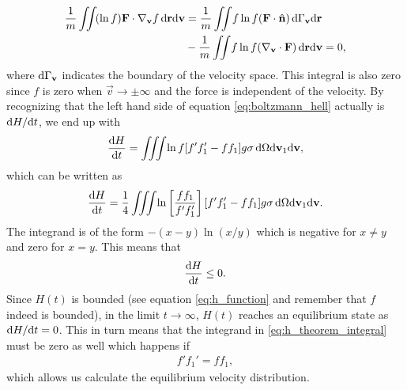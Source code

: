 \begin{align}
	\nonumber
	\frac{1}{m}\iint\! (\ln f) \mathbf F\cdot \nabla_\mathbf v f \,\mathrm{d}\mathbf r\mathrm{d}\mathbf v &= \frac{1}{m}\iint\! f\ln f (\mathbf F\cdot \hat{\mathbf n}) \,\mathrm{d}\Gamma_\mathbf v\mathrm{d}\mathbf r\\
	&- \frac{1}{m}\iint\! f\ln f (\nabla_\mathbf v \cdot \mathbf F) \,\mathrm{d}\mathbf r\mathrm{d}\mathbf v = 0,
\end{align}
where $\mathrm{d}\Gamma_\mathbf v$ indicates the boundary of the velocity space. This integral is also zero since $f$ is zero when $\vec v\rightarrow \pm \infty$ and the force is independent of the velocity. By recognizing that the left hand side of equation \eqref{eq:boltzmann_hell} actually is $\mathrm{d}H/\mathrm{d}t$, we end up with
\begin{align}
 	\frac{\mathrm{d}H}{\mathrm{d}t} = \iiint\! \ln f [f'f_1' - ff_1] g \sigma \,\mathrm{d}\Omega\mathrm{d}\mathbf v_1 \mathrm{d}\mathbf v,
\end{align}
which can be written as\cite{mcquarrie1973statistical}
\begin{align}
	\label{eq:h_theorem_integral}
 	\frac{\mathrm{d}H}{\mathrm{d}t} = \frac{1}{4}\iiint\! \ln\left[\frac{ff_1}{f'f_1'}\right] [f'f_1' - ff_1]g \sigma \, \mathrm{d}\Omega\mathrm{d}\mathbf v_1 \mathrm{d}\mathbf v.
\end{align}
The integrand is of the form $-(x-y)\ln(x/y)$ which is negative for $x\neq y$ and zero for $x=y$. This means that
\begin{align}
	\frac{\mathrm{d}H}{\mathrm{d}t} \leq 0.
\end{align}
Since $H(t)$ is bounded (see equation \eqref{eq:h_function} and remember that $f$ indeed is bounded), in the limit $t\rightarrow\infty$, $H(t)$ reaches an equilibrium state as $\mathrm{d}H/\mathrm{d}t = 0$. This in turn means that the integrand in \eqref{eq:h_theorem_integral} must be zero as well which happens if
\begin{align}
	\label{eq:equilibrium_f_relation}
	f'f_1' = ff_1,
\end{align}
which allows us calculate the equilibrium velocity distribution.
